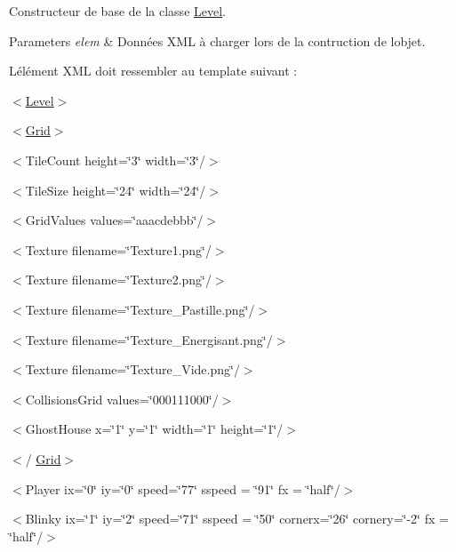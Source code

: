 Constructeur de base de la classe \hyperlink{class_level}{Level}. 


\begin{DoxyParams}{Parameters}
{\em elem} & Données X\+M\+L à charger lors de la contruction de l\textquotesingle{}objet.\\
\hline
\end{DoxyParams}
L\textquotesingle{}élément X\+M\+L doit ressembler au template suivant \+:
\begin{DoxyItemize}
\item $<$\hyperlink{class_level}{Level}$>$
\begin{DoxyItemize}
\item $<$\hyperlink{class_grid}{Grid}$>$
\begin{DoxyItemize}
\item $<$Tile\+Count height=\char`\"{}3\char`\"{} width=\char`\"{}3\char`\"{}/$>$
\item $<$Tile\+Size height=\char`\"{}24\char`\"{} width=\char`\"{}24\char`\"{}/$>$
\item $<$Grid\+Values values=\char`\"{}aaacdebbb\char`\"{}/$>$
\item $<$Texture filename=\char`\"{}\+Texture1.\+png\char`\"{}/$>$
\item $<$Texture filename=\char`\"{}\+Texture2.\+png\char`\"{}/$>$
\item $<$Texture filename=\char`\"{}\+Texture\+\_\+\+Pastille.\+png\char`\"{}/$>$
\item $<$Texture filename=\char`\"{}\+Texture\+\_\+\+Energisant.\+png\char`\"{}/$>$
\item $<$Texture filename=\char`\"{}\+Texture\+\_\+\+Vide.\+png\char`\"{}/$>$
\item $<$Collisions\+Grid values=\char`\"{}000111000\char`\"{}/$>$
\item $<$Ghost\+House x=\char`\"{}1\char`\"{} y=\char`\"{}1\char`\"{} width=\char`\"{}1\char`\"{} height=\char`\"{}1\char`\"{}/$>$
\end{DoxyItemize}
\item $<$/ \hyperlink{class_grid}{Grid}$>$
\item $<$Player ix=\char`\"{}0\char`\"{} iy=\char`\"{}0\char`\"{} speed=\char`\"{}77\char`\"{} sspeed = \char`\"{}91\char`\"{} fx = \char`\"{}half\char`\"{}/$>$
\item $<$Blinky ix=\char`\"{}1\char`\"{} iy=\char`\"{}2\char`\"{} speed=\char`\"{}71\char`\"{} sspeed = \char`\"{}50\char`\"{} cornerx=\char`\"{}26\char`\"{} cornery=\char`\"{}-\/2\char`\"{} fx = \char`\"{}half\char`\"{}/$>$

\end{DoxyItemize}
\end{DoxyItemize}

